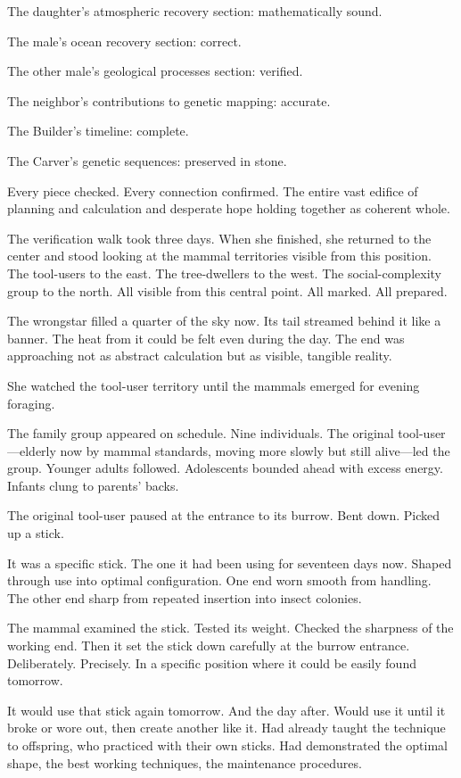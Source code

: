 The daughter's atmospheric recovery section: mathematically sound.

The male's ocean recovery section: correct.

The other male's geological processes section: verified.

The neighbor's contributions to genetic mapping: accurate.

The Builder's timeline: complete.

The Carver's genetic sequences: preserved in stone.

Every piece checked. Every connection confirmed. The entire vast edifice of planning and calculation and desperate hope holding together as coherent whole.

The verification walk took three days. When she finished, she returned to the center and stood looking at the mammal territories visible from this position. The tool-users to the east. The tree-dwellers to the west. The social-complexity group to the north. All visible from this central point. All marked. All prepared.

The wrongstar filled a quarter of the sky now. Its tail streamed behind it like a banner. The heat from it could be felt even during the day. The end was approaching not as abstract calculation but as visible, tangible reality.

She watched the tool-user territory until the mammals emerged for evening foraging.

\scenebreak

The family group appeared on schedule. Nine individuals. The original tool-user—elderly now by mammal standards, moving more slowly but still alive—led the group. Younger adults followed. Adolescents bounded ahead with excess energy. Infants clung to parents' backs.

The original tool-user paused at the entrance to its burrow. Bent down. Picked up a stick.

It was a specific stick. The one it had been using for seventeen days now. Shaped through use into optimal configuration. One end worn smooth from handling. The other end sharp from repeated insertion into insect colonies.

The mammal examined the stick. Tested its weight. Checked the sharpness of the working end. Then it set the stick down carefully at the burrow entrance. Deliberately. Precisely. In a specific position where it could be easily found tomorrow.

It would use that stick again tomorrow. And the day after. Would use it until it broke or wore out, then create another like it. Had already taught the technique to offspring, who practiced with their own sticks. Had demonstrated the optimal shape, the best working techniques, the maintenance procedures.

